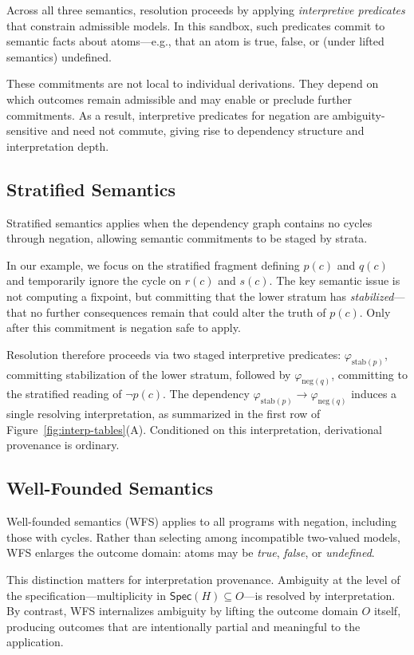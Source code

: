 \documentclass[acmsmall,nonacm]{acmart}
\theoremstyle{remark}
\numberwithin{definition}{section}
\numberwithin{theorem}{section}
\numberwithin{lemma}{section}
\numberwithin{corollary}{section}
\numberwithin{remark}{section}
\numberwithin{example}{section}
\numberwithin{observation}{section}
\numberwithin{assumption}{section}
\newcommand{\Spec}{\mathsf{Spec}}
\begin{document}
Across all three semantics, resolution proceeds by applying \emph{interpretive
predicates} that constrain admissible models.
In this sandbox, such predicates commit to semantic facts about atoms—e.g.,
that an atom is true, false, or (under lifted semantics) undefined.

These commitments are not local to individual derivations.
They depend on which outcomes remain admissible and may enable or preclude further
commitments.
As a result, interpretive predicates for negation are ambiguity-sensitive and need
not commute, giving rise to dependency structure and interpretation depth.

\subsection{Stratified Semantics}

Stratified semantics applies when the dependency graph contains no cycles through
negation, allowing semantic commitments to be staged by strata.

In our example, we focus on the stratified fragment defining $p(c)$ and $q(c)$ and
temporarily ignore the cycle on $r(c)$ and $s(c)$.
The key semantic issue is not computing a fixpoint, but committing that the lower
stratum has \emph{stabilized}—that no further consequences remain that could alter
the truth of $p(c)$.
Only after this commitment is negation safe to apply.

Resolution therefore proceeds via two staged interpretive predicates:
$\varphi_{\mathrm{stab}(p)}$, committing stabilization of the lower stratum, followed
by $\varphi_{\mathrm{neg}(q)}$, committing to the stratified reading of $\neg p(c)$.
The dependency
$\varphi_{\mathrm{stab}(p)} \rightarrow \varphi_{\mathrm{neg}(q)}$
induces a single resolving interpretation, as summarized in the first row of
Figure~\ref{fig:interp-tables}(A).
Conditioned on this interpretation, derivational provenance is ordinary.

\subsection{Well-Founded Semantics}

Well-founded semantics (WFS) applies to all programs with negation, including those
with cycles.
Rather than selecting among incompatible two-valued models, WFS enlarges the
outcome domain: atoms may be \emph{true}, \emph{false}, or \emph{undefined}.

This distinction matters for interpretation provenance.
Ambiguity at the level of the specification—multiplicity in $\Spec(H) \subseteq
O$—is resolved by interpretation.
By contrast, WFS internalizes ambiguity by lifting the outcome domain $O$ itself,
producing outcomes that are intentionally partial and meaningful to the
application.
\end{document}
